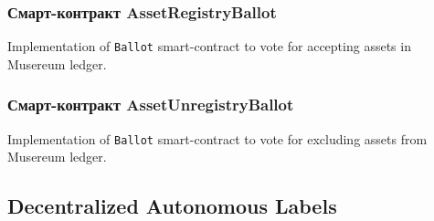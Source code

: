 \documentclass[12pt]{report}
\def\code#1{\colorbox{light-gray}{\texttt{#1}}}
\begin{document}
\subsubsection{Смарт-контракт AssetRegistryBallot}
\label{tech-apps-assets-regballot}
Implementation of \code{Ballot} smart-contract to vote for accepting assets in Musereum ledger.

\subsubsection{Смарт-контракт AssetUnregistryBallot}
\label{tech-apps-assets-unregballot}
Implementation of \code{Ballot} smart-contract to vote for excluding assets from Musereum ledger.

\subsection{Decentralized Autonomous Labels}
\label{tech-apps-dal}
\end{document}
